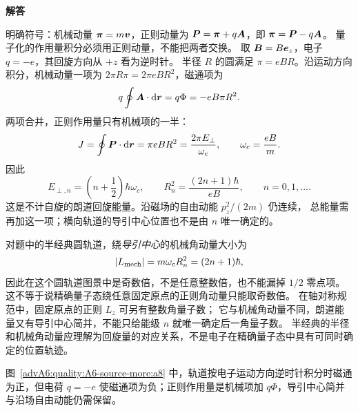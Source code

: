 \begin{advsolution}
\begin{center}\begin{minipage}{.96\linewidth}\centering
\raggedright{\bfseries\color{DeepBlue}解答}\par\smallskip\centering

\label{advA6:quality:A6-source-more:a8}
\end{minipage}\end{center}

明确符号：机械动量 $\bm{\pi}=m\bm{v}$，正则动量为
$\bm{P}=\bm{\pi}+q\bm{A}$，即 $\bm{\pi}=\bm{P}-q\bm{A}$。
量子化的作用量积分必须用正则动量，不能把两者交换。
取 $\bm{B}=B\bm{e}_z$，电子 $q=-e$，其回旋方向从 $+z$ 看为逆时针。
半径 $R$ 的圆满足 $\pi=eBR$。沿运动方向积分，机械动量一项为
$2\pi R\pi=2\pi eBR^2$，磁通项为
\[
 q\oint\bm{A}\cdot\mathop{}\!\mathrm d\bm{r}=q\Phi=-eB\pi R^2.
\]
两项合并，正则作用量只有机械项的一半：
\[
 J=\oint\bm{P}\cdot\mathop{}\!\mathrm d\bm{r}=\pi eBR^2
 =\frac{2\pi E_\perp}{\omega_c},\qquad \omega_c=\frac{eB}m.
\]
因此
\[
 \boxed{E_{\perp,n}=\left(n+\frac12\right)\hbar\omega_c},\qquad
 \boxed{R_n^2=\frac{(2n+1)\hbar}{eB}},\qquad n=0,1,\ldots.
\]
这是不计自旋的朗道回旋能量。沿磁场的自由动能 $p_z^2/(2m)$ 仍连续，
总能量需再加这一项；横向轨道的导引中心位置也不是由 $n$ 唯一确定的。

对题中的半经典圆轨道，绕\emph{导引中心}的机械角动量大小为
\[
 |L_{\rm mech}|=m\omega_cR_n^2=(2n+1)\hbar,
\]
因此在这个圆轨道图景中是奇数倍，不是任意整数倍，也不能漏掉 $1/2$ 零点项。
这不等于说精确量子态绕任意固定原点的正则角动量只能取奇数倍。
在轴对称规范中，固定原点的正则 $L_z$ 可另有整数角量子数；
它与机械角动量不同，朗道能量又有导引中心简并，不能只给能级 $n$ 就唯一确定后一角量子数。
半经典的半径和机械角动量应理解为回旋量的对应关系，不是电子在精确量子态中具有可同时确定的位置轨迹。

图~\ref{advA6:quality:A6-source-more:a8} 中，轨道按电子运动方向逆时针积分时磁通为正，但电荷 $q=-e$ 使磁通项为负；正则作用量是机械项加 $q\Phi$，导引中心简并与沿场自由动能仍需保留。
\end{advsolution}

